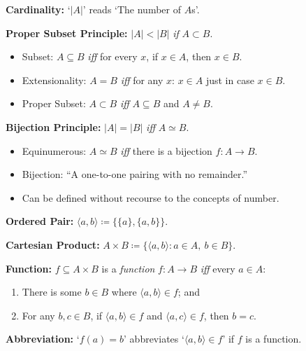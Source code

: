 \documentclass[handout]{beamer}
\newcommand{\tuple}[1]{\langle#1\rangle} %
\renewcommand{\tuple}[1]{\langle#1\rangle} %
\newcommand{\set}[1]{\lbrace#1\rbrace} %
\newcommand{\abs}[1]{|#1|} %
\begin{document}



\begin{frame}

  \textbf{Cardinality:} `$\abs{A}$' reads `The number of $A$s'.
  \vspace{.2in}
  \pause

  \textbf{Proper Subset Principle:} $\abs{A}<\abs{B}$ \textit{if} $A\subset B$.
  \pause

  \begin{itemize}
    \item Subset: $A\subseteq B$ \textit{iff} for every $x$, if $x \in A$, then $x \in B$.
    \item Extensionality: $A = B$ \textit{iff} for any $x$: $x \in A$ just in case $x \in B$. 
    \item Proper Subset: $A\subset B$ \textit{iff} $A \subseteq B$ and $A \neq B$. 
  \end{itemize}
  \vspace{.1in}
  \pause

  \textbf{Bijection Principle:} $\abs{A}=\abs{B}$ \textit{iff} $A\simeq B$.
  \pause

  \begin{itemize}
    \item Equinumerous: $A\simeq B$ \textit{iff} there is a bijection $f: A \to B$.
    \item Bijection: ``A one-to-one pairing with no remainder.'' 
    \item Can be defined without recourse to the concepts of number.
  \end{itemize}
  \vspace{.2in}

  

\end{frame}




\begin{frame}

  \textbf{Ordered Pair:} $\tuple{a,b}\coloneq \set{\set{a},\set{a,b}}$.
  \vspace{.2in}

  \textbf{Cartesian Product:} $A\times B\coloneq \set{\tuple{a,b}:a\in A,\ b\in B}$.
  \vspace{.2in}

  \textbf{Function:} $f\subseteq A\times B$ is a \textit{function} $f: A\to B$ \textit{iff} every $a\in A$:\\ 
    \begin{enumerate}
      \item There is some $b\in B$ where $\tuple{a,b}\in f$; and
      \item For any $b,c\in B$, if $\tuple{a,b} \in f$ and $\tuple{a,c}\in f$, then $b=c$. 
    \end{enumerate}
  \vspace{.2in}

  \textbf{Abbreviation:} `$f(a)=b$' abbreviates `$\tuple{a,b}\in f$' if $f$ is a function. 
  \vspace{.2in}

\end{frame}
\end{document}
